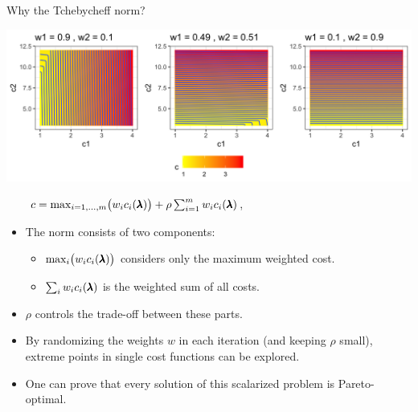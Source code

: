 \documentclass[11pt,compress,t,notes=noshow,xcolor=table]{beamer}
\begin{document}
\begin{vbframe}{Why the Tchebycheff norm?}

\begin{center}
\includegraphics[scale=0.08]{slides/11-multicrit/figure_man/parego_viz.png}
\end{center}

$\qquad c = \max_{i=1,\dots,m}\bigl(w_i c_i(\pmb{\lambda})\bigr) 
    + \rho \sum_{i=1}^m w_i c_i(\pmb{\lambda})$,
\begin{scriptsize}
\begin{itemize}
  \item The norm consists of two components:
    \begin{itemize}
      \item $\max_{i}\bigl(w_i c_i(\pmb{\lambda})\bigr)$ 
            considers only the maximum weighted cost.
      \item $\sum_{i} w_ic_i(\pmb{\lambda})$ is the weighted sum of all costs.
    \end{itemize}
  \item $\rho$ controls the trade-off between these parts.
  \item By randomizing the weights $w$ in each iteration (and keeping $\rho$ small), 
        extreme points in single cost functions can be explored.
  \item One can prove that every solution of this scalarized problem is 
        Pareto-optimal.
\end{itemize}
\end{scriptsize}

\end{vbframe}
\end{document}
